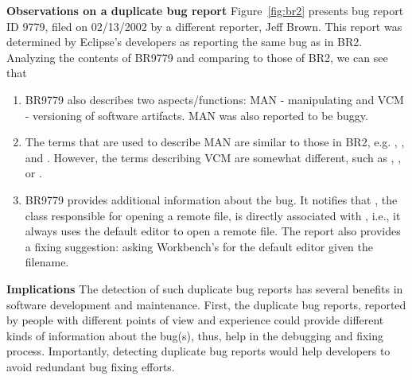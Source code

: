 \vspace{0.04in}\noindent\textbf{Observations on a duplicate bug
report} Figure~\ref{fig:br2} presents bug report ID 9779, filed on
02/13/2002 by a different reporter, Jeff Brown. This report was
determined by Eclipse's developers as reporting the same bug as in
BR2. Analyzing the contents of BR9779 and comparing to those of BR2,
we can see that


\begin{enumerate}


\item BR9779 also describes two aspects/functions: MAN - manipulating and
VCM - versioning of software artifacts. MAN was also reported to be
buggy.

\item The terms that are used to describe MAN are similar to those in BR2,
e.g. , , and . However, the terms
describing VCM are somewhat different, such as ,
, or .

\item BR9779 provides additional information about the bug. It notifies
that , the class responsible for opening
a remote file, is directly associated with
, i.e., it always uses the
default editor to open a remote file. The report also provides a
fixing suggestion: asking Workbench's  for the
default editor given the filename.

\end{enumerate}

\vspace{0.03in}\noindent\textbf{Implications} The detection of such
duplicate bug reports has several benefits in software development and
maintenance. First, the duplicate bug reports, reported by people with
different points of view and experience could provide different kinds
of information about the bug(s), thus, help in the debugging and
fixing process. Importantly, detecting duplicate bug reports would
help developers to avoid redundant bug fixing efforts.

